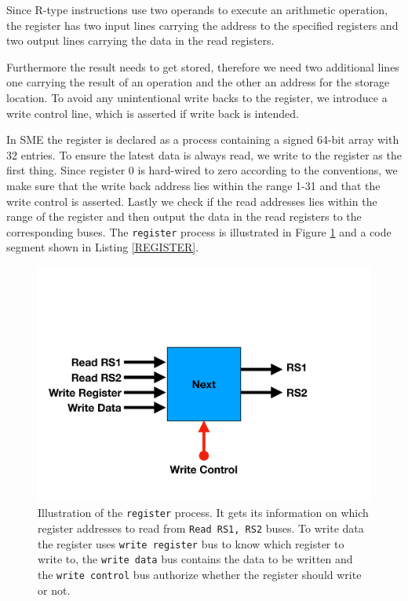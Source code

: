         Since R-type instructions use two operands to execute an arithmetic operation, the register has two input lines carrying the address to the specified registers and two output lines carrying the data in the read registers.
        
        Furthermore the result needs to get stored, therefore we need two additional lines one carrying the result of an operation and the other an address for the storage location. To avoid any unintentional write backs to the register, we introduce a write control line, which is asserted if write back is intended.
        
        In SME the register is declared as a process containing a signed 64-bit array with 32 entries. To ensure the latest data is always read, we write to the register as the first thing. Since register 0 is hard-wired to zero according to the conventions, we make sure that the write back address lies within the range 1-31 and that the write control is asserted.
        Lastly we check if the read addresses lies within the range of the register and then output the data in the read registers to the corresponding buses. The \texttt{register} process is illustrated in Figure \ref{fig:REGISTER} and a code segment shown in Listing \ref{REGISTER}.
    
        \begin{figure}[h!]
            \centering
            \includegraphics[scale=0.29]{pictures/REGISTER.pdf}
            \caption{Illustration of the \texttt{register} process. It gets its information on which register addresses to read from \texttt{Read RS1, RS2} buses. To write data the register uses \texttt{write register} bus to know which register to write to, the \texttt{write data} bus contains the data to be written and the \texttt{write control} bus authorize whether the register should write or not.}
            \label{fig:REGISTER}
        \end{figure}
    
